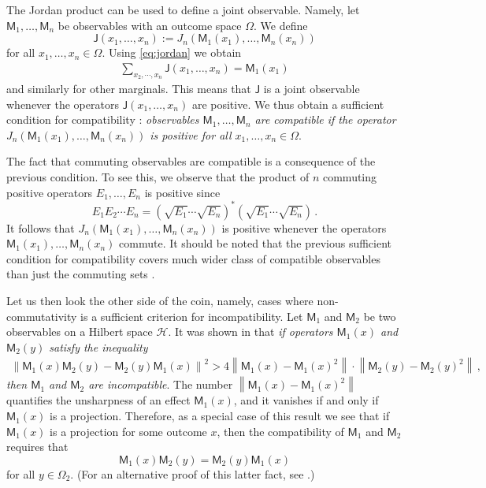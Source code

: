 \documentclass[12pt]{article}
\theoremstyle{definition}
\newcommand{\hi}{\mathcal{H}} %
\newcommand{\no}[1]{\left\|#1\right\|} %
\newcommand{\Jo}{\mathsf{J}}%
\newcommand{\Mo}{\mathsf{M}}%
\begin{document}
The Jordan product can be used to define a joint observable.
Namely, let $\Mo_1,\ldots,\Mo_n$ be observables with an outcome space $\Omega$.
We define
\begin{equation}
\Jo(x_1,\ldots,x_n) := J_n(\Mo_1(x_1),\ldots,\Mo_n(x_n))
\end{equation}
for all $x_1,\ldots,x_n\in\Omega$.
Using \eqref{eq:jordan} we obtain
\begin{align}
\sum_{x_2,\cdots,x_n} \Jo(x_1,\ldots,x_n) = \Mo_1(x_1)
\end{align}
and similarly for other marginals.
This means that $\Jo$ is a joint observable whenever the operators $ \Jo(x_1,\ldots,x_n)$ are positive.
We thus obtain a sufficient condition for compatibility \cite{Heinosaari13}: \emph{observables $\Mo_1,\ldots,\Mo_n$ are compatible if the operator $J_n(\Mo_1(x_1),\ldots,\Mo_n(x_n))$ is positive for all $x_1,\ldots,x_n\in\Omega$}.

The fact that commuting observables are compatible is a consequence of the previous condition.
To see this, we observe that the product of $n$ commuting positive operators $E_1,\ldots,E_n$ is positive since 
\begin{equation}
E_1E_2\cdots E_n =  \left( \sqrt{E_1}\cdots\sqrt{E_{n}} \right)^* \left( \sqrt{E_1}\cdots\sqrt{E_{n}} \right) \, .
\end{equation}
It follows that $J_n(\Mo_1(x_1),\ldots,\Mo_n(x_n))$ is positive whenever the operators $\Mo_1(x_1),\ldots,\Mo_n(x_n)$ commute.
It should be noted that the previous sufficient condition for compatibility covers much wider class of compatible observables than just the commuting sets \cite{Heinosaari13}.

Let us then look the other side of the coin, namely, cases where non-commutativity is 
a sufficient criterion for incompatibility. 
Let $\Mo_1$ and $\Mo_2$ 
be two observables on a Hilbert space $\hi$. 
It was shown in \cite{MiIm08} that \emph{if operators $\Mo_1(x)$ and $\Mo_2(y)$ 
satisfy the inequality
\begin{align}\label{eq:tm-ineq}
\no{\Mo_1(x)\Mo_2(y) - \Mo_2(y)\Mo_1(x)} ^2 >
4 \no{ \Mo_1(x) - \Mo_1(x)^2 }
\cdot
\no{ \Mo_2(y) - \Mo_2(y)^2 } \, , 
\end{align}
then $\Mo_1$ and $\Mo_2$ are incompatible}. 
The number $\no{ \Mo_1(x) -\Mo_1(x)^2}$ quantifies the 
unsharpness of an effect $\Mo_1(x)$, and it vanishes if and only if 
$\Mo_1(x)$ is a projection. 
Therefore, as a special case of this result we see that if $\Mo_1(x)$ is a projection for some outcome $x$, then the compatibility of $\Mo_1$ and $\Mo_2$ requires that 
\begin{equation}
\Mo_1(x)\Mo_2(y)=\Mo_2(y)\Mo_1(x)
\end{equation}
 for all $y\in\Omega_2$.
 (For an alternative proof of this latter fact, see \cite{HeReSt08}.)
\end{document}
